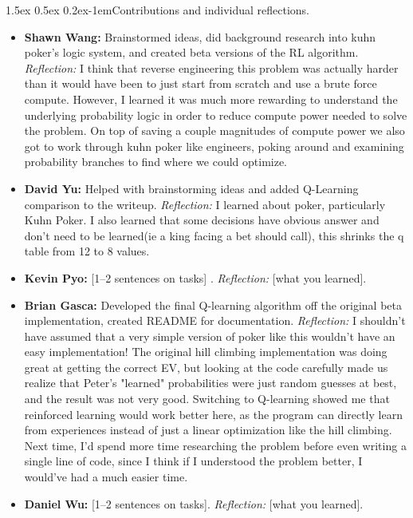 \documentclass{article}
\makeatletter
\renewcommand{\paragraph}{\@startsection{paragraph}{4}{\z@}%
    {1.5ex \@plus 0.5ex \@minus 0.2ex}{-1em}{\normalsize\bf}}
\makeatother
\begin{document}
\paragraph{Contributions and individual reflections.}
\begin{itemize}\itemsep2pt
  \item \textbf{Shawn Wang:} Brainstormed ideas, did background research into kuhn poker's logic system, and created beta versions of the RL algorithm. \emph{Reflection:} I think that reverse engineering this problem was actually harder than it would have been to just start from scratch and use a brute force compute. However, I learned it was much more rewarding to understand the underlying probability logic in order to reduce compute power needed to solve the problem. On top of saving a couple magnitudes of compute power we also got to work through kuhn poker like engineers, poking around and examining probability branches to find where we could optimize.
  \item \textbf{David Yu:} Helped with brainstorming ideas and added Q-Learning comparison to the writeup. \emph{Reflection:} I learned about poker, particularly Kuhn Poker. I also learned that some decisions have obvious answer and don't need to be learned(ie a king facing a bet should call), this shrinks the q table from 12 to 8 values.
  \item \textbf{Kevin Pyo:} [1--2 sentences on tasks] . \emph{Reflection:} [what you learned].
  \item \textbf{Brian Gasca:} Developed the final Q-learning algorithm off the original beta implementation,  created README for documentation. \emph{Reflection:} I shouldn't have assumed that a very simple version of poker like this wouldn't have an easy implementation! The original hill climbing implementation was doing great at getting the correct EV, but looking at the code carefully made us realize that Peter's "learned" probabilities were just random guesses at best, and the result was not very good. Switching to Q-learning showed me that reinforced learning would work better here, as the program can directly learn from experiences instead of just a linear optimization like the hill climbing. Next time, I'd spend more time researching the problem before even writing a single line of code, since I think if I understood the problem better, I would've had a much easier time.
  \item \textbf{Daniel Wu:} [1--2 sentences on tasks]. \emph{Reflection:} [what you learned].
\end{itemize}
\end{document}
